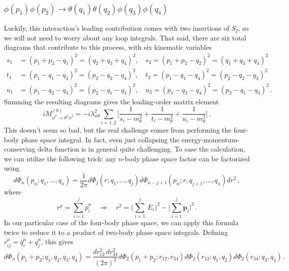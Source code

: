 \documentclass{article}
\numberwithin{equation}{subsection}
\begin{document}
\subsubsection{$\phi(p_1)\phi(p_2)\to\theta(q_1)\theta(q_2)\phi(q_3)\phi(q_4)$}

Luckily, this interaction's leading contribution comes with two insertions of $S_I$, so we will not need to worry about any loop integrals. That said, there
are six total diagrams that contribute to this process, with six kinematic variables
\begin{equation}\begin{split}
	s_1 &= (p_1 + p_2 - q_1)^2 = (q_2 + q_3 + q_4)^2, \quad s_2 = (p_1 + p_2 - q_2)^2 = (q_1 + q_3 + q_4)^2\\[0.5em]
	t_1 &= (p_1 - q_1 - q_3)^2 = (p_2 - q_2 - q_4)^2, \quad t_2 = (p_1 - q_1 - q_4)^2 = (p_2 - q_2 - q_3)^2\\[0.5em]
	u_1 &= (p_1 - q_2 - q_3)^2 = (p_2 - q_1 - q_4)^2, \quad u_2 = (p_1 - q_2 - q_4)^2 = (p_2 - q_1 - q_3)^2\,.
\end{split}\end{equation}
Summing the resulting diagrams gives the leading-order matrix element
\begin{equation}
	iM^{(0)}_{\phi^2\to\theta^2\phi^2} = -i\lambda_{\phi\theta}^2\sum_{i = 1,2}
		\Big[\frac{1}{s_i - m_\theta^2} + \frac{1}{t_i - m_\theta^2} + \frac{1}{u_i - m_\theta^2}\Big]\,.
\end{equation}
This doesn't seem so bad, but the real challenge comes from performing the four-body phase space integral. In fact, even just collapsing the energy-momentum-conserving
delta function is in general quite challenging. To ease the calculation, we can utilize the following trick: any $n$-body phase space factor can be factorized using
\begin{equation}
	d\Phi_n(p_\alpha;q_1,\dots,q_n) = \frac{1}{2\pi}d\Phi_j(r;q_1,\dots,q_j)d\Phi_{n-j+1}(p_\alpha;r,q_{j+1},\dots,q_n)dr^2\,,
\end{equation}
where
\begin{equation}
	r^\mu = \sum_{i = 1}^j p_i^\mu \quad \Rightarrow \quad r^2 = \Bigg(\sum_{i=1}^j\,E_i\Bigg)^2 - \Bigg|\sum_{i = 1}^j \mathbf{p}_i\Bigg|^2\,.
\end{equation}
In our particular case of the four-body phase space, we can apply this formula twice to reduce it to a product of two-body phase space integrals. Defining
$r_{ij}^\mu = q_i^\mu + q_j^\mu$, this gives
\begin{equation}
	d\Phi_n(p_1 + p_2; q_1, q_2, q_3, q_4) = \frac{dr_{12}^2\,dr_{34}^2}{(2\pi)^2}d\Phi_2(p_1 + p_2; r_{12}, r_{34})d\Phi_2(r_{12}; q_1, q_2)d\Phi_2(r_{34}; q_3, q_4)\,.
\end{equation}
\end{document}
